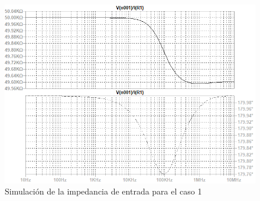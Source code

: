 \begin{figure}[H]
\begin{centering}
\includegraphics[scale=0.5]{../Ex1/iB/Resources1b/zinp1_sim}
\par\end{centering}
\caption{Simulación de la impedancia de entrada para el caso 1}

\end{figure}

